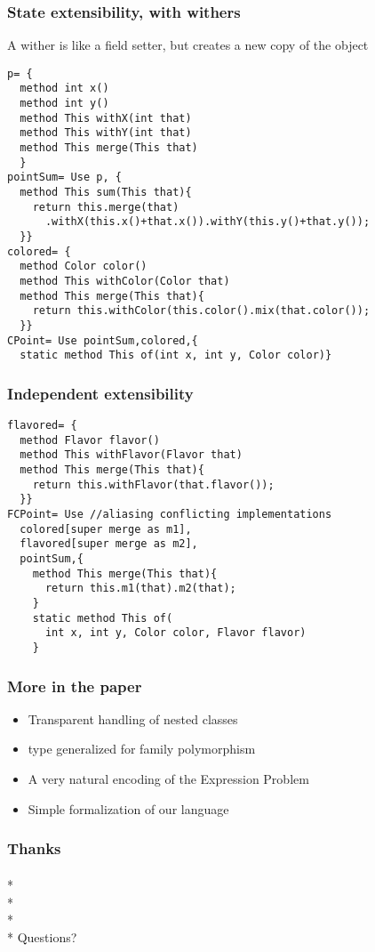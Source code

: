 \begin{frame}[fragile]
\frametitle{State extensibility, with withers}
\vspace{-1ex}
A wither is like a field setter, but creates a new copy of the object
\vspace{-1ex}
 \begin{lstlisting}
p= { 
  method int x()
  method int y()
  method This withX(int that)
  method This withY(int that)
  method This merge(This that)
  }
pointSum= Use p, { 
  method This sum(This that){
    return this.merge(that)
      .withX(this.x()+that.x()).withY(this.y()+that.y());
  }}
colored= {
  method Color color()
  method This withColor(Color that)
  method This merge(This that){
    return this.withColor(this.color().mix(that.color());
  }}
CPoint= Use pointSum,colored,{
  static method This of(int x, int y, Color color)}
\end{lstlisting}  
\end{frame}





\begin{frame}[fragile]
\frametitle{Independent extensibility}

 \begin{lstlisting}
flavored= {
  method Flavor flavor()
  method This withFlavor(Flavor that)
  method This merge(This that){
    return this.withFlavor(that.flavor());
  }}
FCPoint= Use //aliasing conflicting implementations
  colored[super merge as m1],
  flavored[super merge as m2],
  pointSum,{
    method This merge(This that){
      return this.m1(that).m2(that);
    }
    static method This of(
      int x, int y, Color color, Flavor flavor)
    }
\end{lstlisting} 
\end{frame}

\begin{frame}[fragile]
\frametitle{More in the paper}

\begin{itemize}
\item Transparent handling of nested classes
\item \Q@This@ type generalized for family polymorphism
\item A very natural encoding of the Expression Problem 
\item Simple formalization of our language
\end{itemize}

\end{frame}

\begin{frame}[fragile]
\frametitle{Thanks}
${}_{}$\\*
${}_{}$\\*
${}_{}$\\*
${}_{}$\\*
Questions?
\end{frame}


